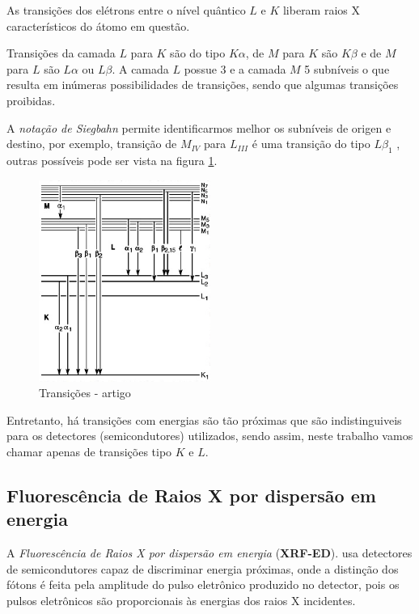 As transições dos elétrons entre o nível quântico $L$ e
$K$ liberam raios X característicos do átomo em questão. 

Transições da camada $L$ para $K$ são do tipo $K\alpha$, de $M$ para $K$ 
são $K\beta$ e de $M$ para $L$ são $L\alpha$ ou $L\beta$. 
A camada $L$ possue 3 e a camada $M$ 5 subníveis o que
resulta em inúmeras possibilidades de transições, sendo que algumas transições
proibidas. 

A \textit{notação de Siegbahn} permite identificarmos melhor os subníveis
de origen e destino, por exemplo, transição de $M_{IV}$ para $L_{III}$ é uma transição do 
tipo $L\beta_1$ \citep{jenkins1991}, outras possíveis pode ser vista na
figura \ref{fig:siegbahn}. 

\begin{figure}[H]
\begin{center} 
  \includegraphics[width=0.5\textwidth]{../inputs/images/Siegbahn.jpg}
  \caption{Transições - artigo \citep{jenkins1991}  \label{fig:siegbahn}}
\end{center}
\end{figure}

Entretanto, há transições com energias são tão próximas 
que são indistinguiveis para os detectores (semicondutores) 
utilizados, sendo assim, neste trabalho vamos chamar apenas de 
transições tipo $K$ e $L$.

\subsection{Fluorescência de Raios X por dispersão em energia}

A \textit{Fluorescência de Raios X por dispersão em energia} (\textbf{XRF-ED}).
usa detectores de semicondutores capaz de discriminar energia 
próximas, onde a distinção dos fótons é feita pela amplitude do pulso 
eletrônico produzido no detector, pois os pulsos eletrônicos são
proporcionais às energias dos raios X incidentes. 


